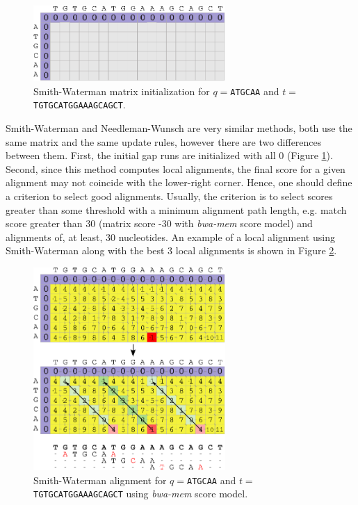 \begin{figure}[h]
	\begin{minipage}[b]{\linewidth}
	  \centering
	  \includegraphics*[width=0.65\textwidth]{figures/chap1_sw_init}
	  \caption{Smith-Waterman matrix initialization for $q=$\texttt{ATGCAA} and
       $t=$\texttt{TGTGCATGGAAAGCAGCT}.}
	  \label{fig:chap1:sw-init}
   \end{minipage}
\end{figure}


Smith-Waterman and Needleman-Wunsch are very similar methods, both use
the same matrix and the same update rules, however there are two
differences between them. First, the initial gap runs are initialized
with all 0 (Figure \ref{fig:chap1:sw-init}). Second, since this method
computes local alignments, the final score for a given
alignment may not coincide with the lower-right corner. Hence, one
should define a criterion to select good alignments. Usually, the
criterion is to select scores greater than some threshold with a
minimum alignment path length, e.g. match score greater than 30
(matrix score -30 with {\em bwa-mem} score model) and alignments
of, at least, 30 nucleotides. An example of a local alignment using
Smith-Waterman along with the best 3 local alignments is shown in
Figure \ref{fig:chap1:sw-alignments}. 

\begin{figure}[h]
	\begin{minipage}[b]{\linewidth}
	  \centering
	  \includegraphics*[width=0.65\textwidth]{figures/chap1_sw_alignments}
	  \caption{Smith-Waterman alignment for $q=$\texttt{ATGCAA} and
       $t=$\texttt{TGTGCATGGAAAGCAGCT} using {\em bwa-mem} score model.}
	  \label{fig:chap1:sw-alignments}
   \end{minipage}
\end{figure}


